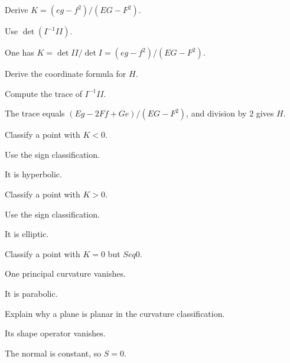 \begin{exercise}\label{exr:vii17-08}
Derive \(K=(eg-f^2)/(EG-F^2)\).
\end{exercise}
\begin{hint}
Use \(\det(I^{-1}II)\).
\end{hint}
\begin{solution}
One has \(K=\det II/\det I=(eg-f^2)/(EG-F^2)\).
\end{solution}

\begin{exercise}\label{exr:vii17-09}
Derive the coordinate formula for \(H\).
\end{exercise}
\begin{hint}
Compute the trace of \(I^{-1}II\).
\end{hint}
\begin{solution}
The trace equals \((Eg-2Ff+Ge)/(EG-F^2)\), and division by \(2\) gives \(H\).
\end{solution}

\begin{exercise}\label{exr:vii17-10}
Classify a point with \(K<0\).
\end{exercise}
\begin{hint}
Use the sign classification.
\end{hint}
\begin{solution}
It is hyperbolic.
\end{solution}

\begin{exercise}\label{exr:vii17-11}
Classify a point with \(K>0\).
\end{exercise}
\begin{hint}
Use the sign classification.
\end{hint}
\begin{solution}
It is elliptic.
\end{solution}

\begin{exercise}\label{exr:vii17-12}
Classify a point with \(K=0\) but \(S
eq0\).
\end{exercise}
\begin{hint}
One principal curvature vanishes.
\end{hint}
\begin{solution}
It is parabolic.
\end{solution}

\begin{exercise}\label{exr:vii17-13}
Explain why a plane is planar in the curvature classification.
\end{exercise}
\begin{hint}
Its shape operator vanishes.
\end{hint}
\begin{solution}
The normal is constant, so \(S=0\).
\end{solution}

